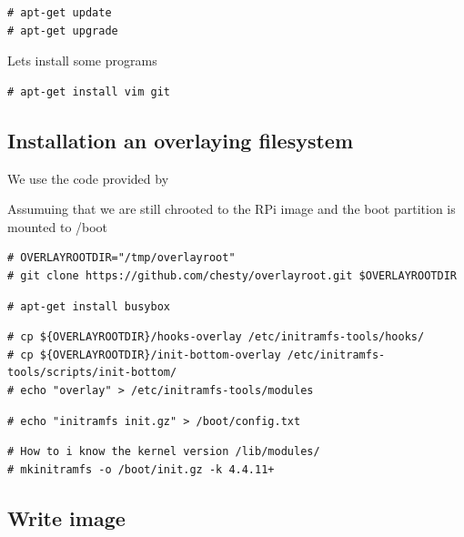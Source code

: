 \begin{lstlisting}[]
# apt-get update
# apt-get upgrade
\end{lstlisting}
\FloatBarrier

Lets install some programs
\begin{lstlisting}[]
# apt-get install vim git
\end{lstlisting}
\FloatBarrier



\subsection{Installation an overlaying filesystem}

We use the code provided by

Assumuing that we are still chrooted to the RPi image and the boot partition is mounted to /boot

\begin{lstlisting}[]
# OVERLAYROOTDIR="/tmp/overlayroot"
# git clone https://github.com/chesty/overlayroot.git $OVERLAYROOTDIR
\end{lstlisting}
\FloatBarrier

\begin{lstlisting}[]
# apt-get install busybox
\end{lstlisting}
\FloatBarrier

\begin{lstlisting}[]
# cp ${OVERLAYROOTDIR}/hooks-overlay /etc/initramfs-tools/hooks/
# cp ${OVERLAYROOTDIR}/init-bottom-overlay /etc/initramfs-tools/scripts/init-bottom/
# echo "overlay" > /etc/initramfs-tools/modules
\end{lstlisting}
\FloatBarrier

\begin{lstlisting}[]
# echo "initramfs init.gz" > /boot/config.txt
\end{lstlisting}
\FloatBarrier

\begin{lstlisting}[]
# How to i know the kernel version /lib/modules/
# mkinitramfs -o /boot/init.gz -k 4.4.11+
\end{lstlisting}
\FloatBarrier

\subsection{Write image}


